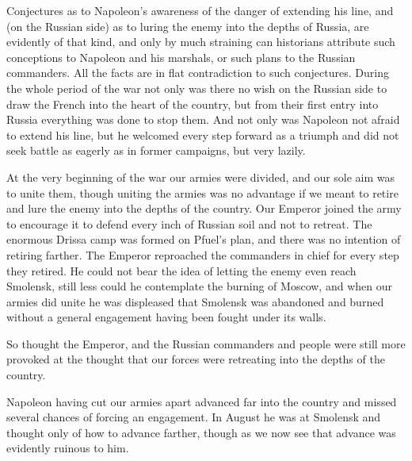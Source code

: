 Conjectures as to Napoleon's awareness of the danger of extending
his line, and (on the Russian side) as to luring the enemy into
the depths of Russia, are evidently of that kind, and only by
much straining can historians attribute such conceptions to
Napoleon and his marshals, or such plans to the Russian
commanders. All the facts are in flat contradiction to such
conjectures. During the whole period of the war not only was
there no wish on the Russian side to draw the French into the
heart of the country, but from their first entry into Russia
everything was done to stop them. And not only was Napoleon not
afraid to extend his line, but he welcomed every step forward as
a triumph and did not seek battle as eagerly as in former
campaigns, but very lazily.

At the very beginning of the war our armies were divided, and our
sole aim was to unite them, though uniting the armies was no
advantage if we meant to retire and lure the enemy into the
depths of the country. Our Emperor joined the army to encourage
it to defend every inch of Russian soil and not to retreat. The
enormous Drissa camp was formed on Pfuel's plan, and there was no
intention of retiring farther. The Emperor reproached the
commanders in chief for every step they retired. He could not
bear the idea of letting the enemy even reach Smolensk, still
less could he contemplate the burning of Moscow, and when our
armies did unite he was displeased that Smolensk was abandoned
and burned without a general engagement having been fought under
its walls.

So thought the Emperor, and the Russian commanders and people
were still more provoked at the thought that our forces were
retreating into the depths of the country.

Napoleon having cut our armies apart advanced far into the
country and missed several chances of forcing an engagement. In
August he was at Smolensk and thought only of how to advance
farther, though as we now see that advance was evidently ruinous
to him.

